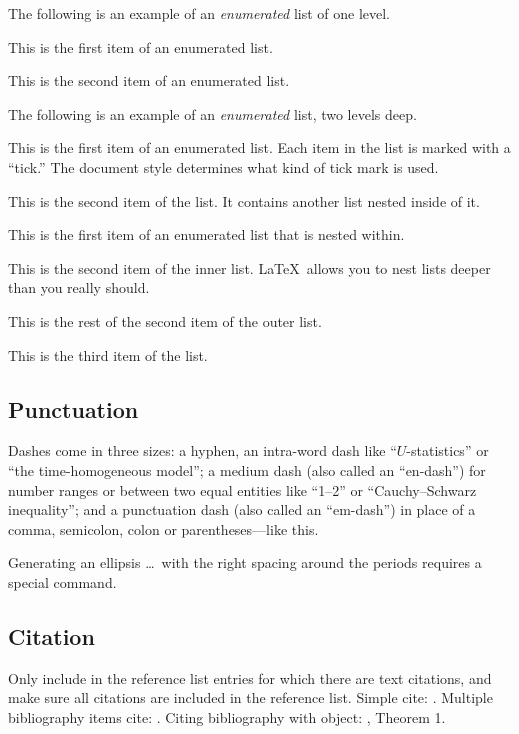 \documentclass[aop]{imsart}
\theoremstyle{plain}
\theoremstyle{definition}
\begin{document}
The following is an example of an \emph{enumerated} list of one level.

\begin{longlist}
\item This is the first item of an enumerated list.
\item This is the second item of an enumerated list.
\end{longlist}

The following is an example of an \emph{enumerated} list, two levels deep.
\begin{longlist}
\item[1.]
This is the first item of an enumerated list.  Each item
in the list is marked with a ``tick.''  The document
style determines what kind of tick mark is used.
\item[2.]
This is the second item of the list.  It contains another
list nested inside of it.
\begin{longlist}
\item
This is the first item of an enumerated list that
is nested within.
\item
This is the second item of the inner list.  \LaTeX\
allows you to nest lists deeper than you really should.
\end{longlist}
This is the rest of the second item of the outer list.
\item[3.]
This is the third item of the list.
\end{longlist}

\subsection{Punctuation}
Dashes come in three sizes: a hyphen, an intra-word dash like ``$U$-statistics'' or ``the time-homogeneous model'';
a medium dash (also called an ``en-dash'') for number ranges or between two equal entities like ``1--2'' or ``Cauchy--Schwarz inequality'';
and a punctuation dash (also called an ``em-dash'') in place of a comma, semicolon,
colon or parentheses---like this.

Generating an ellipsis \ldots\ with the right spacing
around the periods requires a special command.

\subsection{Citation}
Only include in the reference list entries for which there are text citations,
and make sure all citations are included in the reference list.
Simple cite: \cite{r1}.
Multiple bibliography items cite: \cite{r1,r2,r3,r4}.
Citing bibliography with object: \cite{r1}, Theorem 1.
\end{document}
